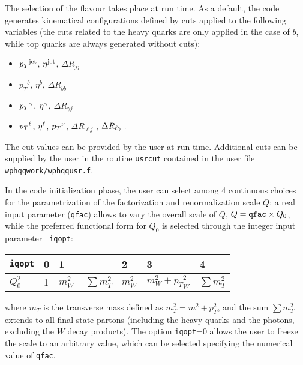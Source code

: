 \documentclass[paper]{JHEP3}
\def    \bbar   {\bar{b}}
\def    \pt             {\mbox{$p_T$}}
\def    \ptsq           {\mbox{$p^2_T$}}
\def    \mT             {\mbox{$m_T$}}
\def    \mTsq           {\mbox{$m^2_T$}}
\begin{document}
The selection of the flavour takes place at run time.
As a default, the code generates kinematical configurations defined by
cuts applied to the following variables (the cuts related to the heavy
quarks are only applied in the case of $b$, while top quarks are
always generated without cuts):
\begin{itemize}
\item $\pt^{\rm jet}$, $\eta^{\rm jet}$, $\Delta R_{jj}$
\item $\pt^{ b}$, $\eta^{ b}$, $\Delta R_{b\bbar}$ 
\item $\pt^{\rm \gamma}$, $\eta^{\rm \gamma}$, $\Delta R_{\gamma j}$
\item $\pt^{\rm \ell}$, $\eta^{\rm \ell}$, $\pt^{\rm \nu}$, $\Delta
  R_{\ell j}$ , $\Delta R_{\ell \rm \gamma} \; .$  
\end{itemize}
The  cut values can be provided by the user at run
time. Additional cuts can be supplied by the user in the 
routine {\tt usrcut} contained in the user file {\tt wphqqwork/wphqqusr.f}.

In the code initialization phase, 
the user can select among 4 continuous choices for the parametrization
of the factorization and renormalization scale $Q$: a real input
parameter ({\tt qfac}) allows to vary the overall scale of $Q$,
$Q={\tt qfac}\times Q_0$, while the preferred functional form for
$Q_0$ is selected through the integer input parameter {\tt
  iqopt}:
{\renewcommand{\arraystretch}{1.2}
\begin{center}
\begin{tabular}{l||l|l|l|l|l|}
{\tt iqopt} & 0 & 1 & 2 & 3 & 4 \\  \hline
$Q_0^2$ & 1 & $m_W^2+ \sum \mTsq$ & $m_W^2$ & $m_W^2+\pt_W^2$ & $\sum \mTsq$ 
\end{tabular}
\end{center}
}
where $\mT$ is the transverse mass defined as $\mTsq=m^2+\ptsq$,
and the sum $\sum \mTsq $ extends to all final
state partons (including the heavy quarks and the photons, 
excluding the $W$ decay products).
The option  {\tt iqopt}=0 allows the user to freeze the scale to an
arbitrary value, which can be selected specifying the numerical value
of {\tt qfac}.   
 
\end{document}
